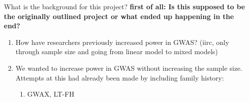 What is the background for this project? \textbf{first of all: Is this supposed to be the originally outlined project or what ended up happening in the end?}



\begin{enumerate}
\item How have researchers previously increased power in GWAS? (iirc, only through sample size and going from linear model to mixed models)
\item We wanted to increase power in GWAS without increasing the sample size. Attempts at this had already been made by including family history:
\begin{enumerate}
	\item GWAX, LT-FH
\end{enumerate}
\end{enumerate}

